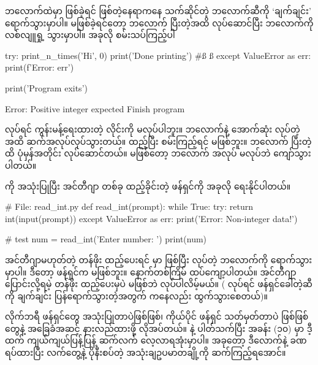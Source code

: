  ဘလောက်ထဲမှာ  ဖြစ်ခဲ့ရင် ဖြစ်တဲ့နေရာကနေ သက်ဆိုင်တဲ့  ဘလောက်ဆီကို ‘ချက်ချင်း’ ရောက်သွားမှာပါ။ မဖြစ်ခဲ့ရင်တော့  ဘလောက် ပြီးတဲ့အထိ လုပ်ဆောင်ပြီး  ဘလောက်ကို လစ်လျူရှု့ သွားမှာပါ။ အခုလို စမ်းသပ်ကြည့်ပါ
%
\begin{py}
try:
    print_n_times('Hi', 0)
    print('Done printing') #ß  ß
except ValueError as err:
    print(f'Error: {err}')

print('Program exits')
\end{py}
{}
\begin{codetxt}
Error: Positive integer expected
Finish program
\end{codetxt}
 လုပ်ရင် ကွန်းမန့်ရေးထားတဲ့ လိုင်းကို မလုပ်ပါဘူး။  ဘလောက်နဲ့ အောက်ဆုံး  လုပ်တဲ့အထိ ဆက်အလုပ်လုပ်သွားတယ်။  ထည့်ပြီး စမ်းကြည့်ရင်  မဖြစ်ဘူး။  ဘလောက် ပြီးတဲ့ထိ ပုံမှန်အတိုင်း လုပ်ဆောင်တယ်။  မဖြစ်တော့  ဘလောက် အလုပ် မလုပ်ဘဲ ကျော်သွားပါတယ်။

 ကို အသုံးပြုပြီး အင်တီဂျာ တစ်ခု  ထည့်ခိုင်းတဲ့ ဖန်ရှင်ကို အခုလို ရေးနိုင်ပါတယ်။
%
\begin{py}
# File: read_int.py
def read_int(prompt):
    while True:
        try:
            return int(input(prompt))
        except ValueError as err:
            print('Error: Non-integer data!')

# test 
num = read_int('Enter number: ')
print(num)
\end{py}
%
အင်တီဂျာမဟုတ်တဲ့ တန်ဖိုး ထည့်ပေးရင်  မှာ   ဖြစ်ပြီး  လုပ်တဲ့ ဘလောက်ကို ရောက်သွားမှာပါ။ ဒီတော့ ဖန်ရှင်က  မဖြစ်ဘူး။   နောက်တစ်ကြိမ် ထပ်ကျော့ပါတယ်။ အင်တီဂျာ ပြောင်းလို့ရမဲ့ တန်ဖိုး ထည့်ပေးမှပဲ  မဖြစ်ဘဲ   လုပ်ပါလိမ့်မယ်။ ( လုပ်ရင် ဖန်ရှင်ခေါ်တဲ့ဆီကို ချက်ချင်း ပြန်ရောက်သွားတဲ့အတွက်  ကနေလည်း ထွက်သွားစေတယ်)။ 

လိုက်ဘရီ ဖန်ရှင်တွေ အသုံးပြုတာပဲဖြစ်ဖြစ်၊ ကိုယ်ပိုင် ဖန်ရှင် သတ်မှတ်တာပဲ ဖြစ်ဖြစ်  တွေနဲ့   အခြေခံအဆင့် နားလည်ထားဖို့ လိုအပ်တယ်။  နဲ့ ပါတ်သက်ပြီး အခန်း (၁၀)  မှာ ဒီ့ထက် ကျယ်ကျယ်ပြန့်ပြန့် ဆက်လက် လေ့လာရအုံးမှာပါ။  အခုတော့ ဒီလောက်နဲ့ ခဏရပ်ထားပြီး လက်တွေ့နဲ့ ပိုနီးစပ်တဲ့  အသုံးချဥပမာတချို့ကို ဆက်ကြည့်ရအောင်။

